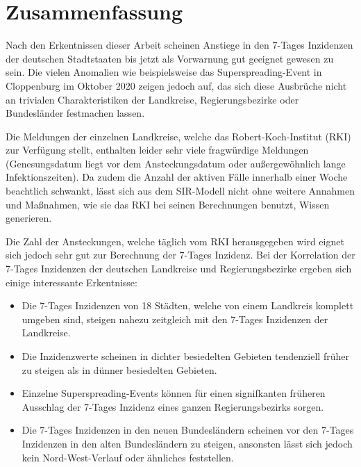 \chapter{Zusammenfassung}\label{chap:Zusammenfassun}
Nach den Erkentnissen dieser Arbeit scheinen Anstiege in den 7-Tages Inzidenzen der deutschen Stadtstaaten bis jetzt als Vorwarnung gut geeignet gewesen zu sein. Die vielen Anomalien wie beispielsweise das Superspreading-Event in Cloppenburg im Oktober 2020 zeigen jedoch auf, das sich diese Ausbrüche nicht an trivialen Charakteristiken der Landkreise, Regierungsbezirke oder Bundesländer festmachen lassen.

Die Meldungen der einzelnen Landkreise, welche das Robert-Koch-Institut (RKI) zur Verfügung stellt, enthalten leider sehr viele fragwürdige Meldungen (Genesungsdatum liegt vor dem Ansteckungsdatum oder außergewöhnlich lange Infektionszeiten). Da zudem die Anzahl der aktiven Fälle innerhalb einer Woche beachtlich schwankt, lässt sich aus dem SIR-Modell nicht ohne weitere Annahmen und Maßnahmen, wie sie das RKI bei seinen Berechnungen benutzt, Wissen generieren.

Die Zahl der Ansteckungen, welche täglich vom RKI herausgegeben wird eignet sich jedoch sehr gut zur Berechnung der 7-Tages Inzidenz.
Bei der Korrelation der 7-Tages Inzidenzen der deutschen Landkreise und Regierungsbezirke ergeben sich einige interessante Erkentnisse:
\begin{itemize}
    \item Die 7-Tages Inzidenzen von 18 Städten, welche von einem Landkreis komplett umgeben sind, steigen nahezu zeitgleich mit den 7-Tages Inzidenzen der Landkreise.
    \item Die Inzidenzwerte scheinen in dichter besiedelten Gebieten tendenziell früher zu steigen als in dünner besiedelten Gebieten.
    \item Einzelne Superspreading-Events können für einen signifkanten früheren Ausschlag der 7-Tages Inzidenz eines ganzen Regierungsbezirks sorgen.
    \item Die 7-Tages Inzidenzen in den neuen Bundesländern scheinen vor den 7-Tages Inzidenzen in den alten Bundesländern zu steigen, ansonsten lässt sich jedoch kein Nord-West-Verlauf oder ähnliches feststellen.
\end{itemize}